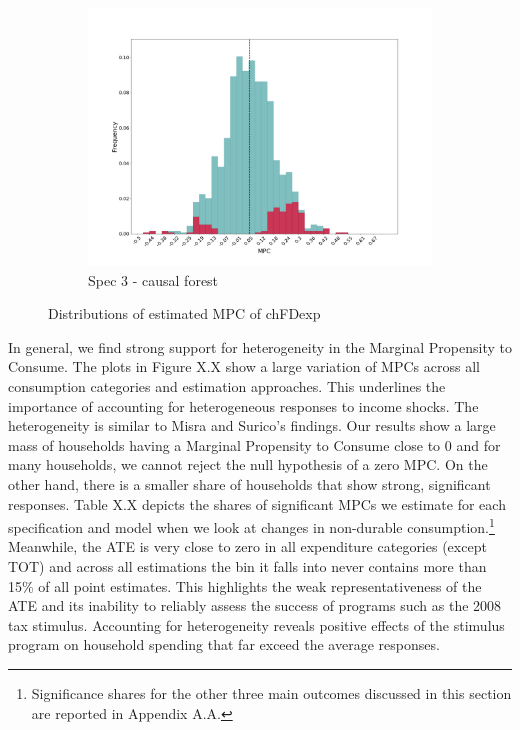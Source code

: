 \begin{figure}[t]
\begin{subfigure}{0.33\linewidth}
        \includegraphics[width=\linewidth]{figures/distributions/spec3_cf_chFDexp.png}
        \caption{Spec 3 - causal forest}
    \end{subfigure}\hfill
    \caption{Distributions of estimated MPC of chFDexp}
\end{figure}
\noindent In general, we find strong support for heterogeneity in the Marginal Propensity to Consume. The plots in Figure X.X show a large variation of MPCs across all consumption categories and estimation approaches. This underlines the importance of accounting for heterogeneous responses to income shocks. The heterogeneity is similar to Misra and Surico’s findings. Our results show a large mass of households having a Marginal Propensity to Consume close to 0 and for many households, we cannot reject the null hypothesis of a zero MPC. On the other hand, there is a smaller share of households that show strong, significant responses. Table X.X depicts the shares of significant MPCs we estimate for each specification and model when we look at changes in non-durable consumption.\footnote{Significance shares for the other three main outcomes discussed in this section are reported in Appendix A.A.} \\
Meanwhile, the ATE is very close to zero in all expenditure categories (except TOT) and across all estimations the bin it falls into never contains more than 15\% of all point estimates. This highlights the weak representativeness of the ATE and its inability to reliably assess the success of programs such as the 2008 tax stimulus. Accounting for heterogeneity reveals positive effects of the stimulus program on household spending that far exceed the average responses. \\
